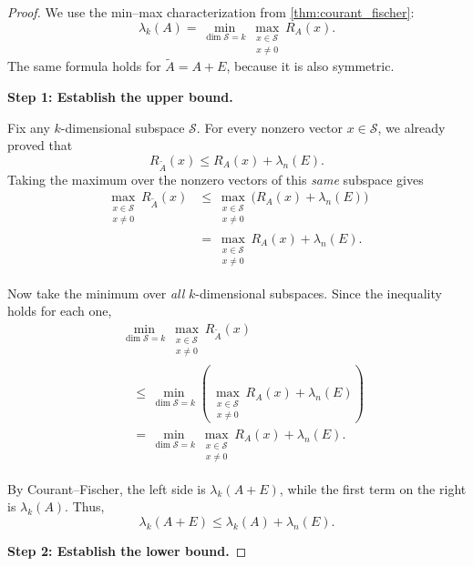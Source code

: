 \documentclass[14pt,letterpaper]{article}
\theoremstyle{plain}
\theoremstyle{definition}
\theoremstyle{remark}
\begin{document}
\begin{proof}
We use the min--max characterization from
\cref{thm:courant_fischer}:
\[
\lambda_k(A)
=\min_{\dim\mathcal S=k}
  \max_{\substack{x\in\mathcal S\\x\neq0}}R_A(x).
\]
The same formula holds for $\widetilde A=A+E$,
because it is also symmetric.

\medskip
\noindent\textbf{Step 1: Establish the upper bound.}

Fix any $k$-dimensional subspace $\mathcal S$.
For every nonzero vector $x\in\mathcal S$, we already
proved that
\[
R_{\widetilde A}(x)
\leq R_A(x)+\lambda_n(E).
\]
Taking the maximum over the nonzero vectors of
this \emph{same} subspace gives
\[
\begin{aligned}
\max_{\substack{x\in\mathcal S\\x\neq0}}
R_{\widetilde A}(x)
&\leq
\max_{\substack{x\in\mathcal S\\x\neq0}}
\bigl(R_A(x)+\lambda_n(E)\bigr)\\
&=\max_{\substack{x\in\mathcal S\\x\neq0}}
R_A(x)+\lambda_n(E).
\end{aligned}
\]




Now take the minimum over \emph{all} $k$-dimensional
subspaces. Since the inequality holds for each one,
\[
\begin{aligned}
&\min_{\dim\mathcal S=k}
\max_{\substack{x\in\mathcal S\\x\neq0}}
R_{\widetilde A}(x)\\
&\quad\leq
\min_{\dim\mathcal S=k}
\left(
\max_{\substack{x\in\mathcal S\\x\neq0}}
R_A(x)+\lambda_n(E)
\right)\\
&\quad=
\min_{\dim\mathcal S=k}
\max_{\substack{x\in\mathcal S\\x\neq0}}
R_A(x)+\lambda_n(E).
\end{aligned}
\]

By Courant--Fischer, the left side is
$\lambda_k(A+E)$, while the first term on the
right is $\lambda_k(A)$. Thus,
\[
\boxed{
\lambda_k(A+E)
\leq\lambda_k(A)+\lambda_n(E).
}
\]

\medskip
\noindent\textbf{Step 2: Establish the lower bound.}


\end{proof}
\end{document}
